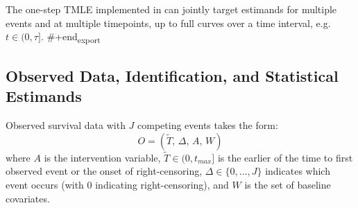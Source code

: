 \documentclass{report}
\newcommand{\1}{\ensuremath{\mathbf{1}}}
\newcommand{\T}{\ensuremath{\widetilde{T}}}
\renewcommand{\L}{\ensuremath{W}}
\begin{document}
The one-step TMLE implemented in  can jointly target estimands for multiple events and at multiple timepoints, up to full curves over a time interval, e.g. \(t \in (0, \tau]\).
\#+end\textsubscript{export}

\subsection{Observed Data, Identification, and Statistical Estimands}
\label{ObservedData}
Observed survival data with \(J\) competing events takes the form:
\begin{equation}
 O = \left(\T,\, \Delta,\, A,\, \L \right) \label{obs-data}
\end{equation}
where \(A\) is the intervention variable, \(\T \in (0, t_{max}]\) is the earlier of the time to first observed event or the onset of right-censoring, \(\Delta \in \{0, \dots, J\}\) indicates which event occurs (with 0 indicating right-censoring), and \(\L\) is the set of baseline covariates.
\end{document}
